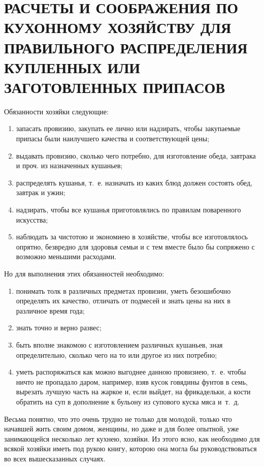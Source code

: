 \section{РАСЧЕТЫ И СООБРАЖЕНИЯ ПО КУХОННОМУ ХОЗЯЙСТВУ ДЛЯ ПРАВИЛЬНОГО РАСПРЕДЕЛЕНИЯ КУПЛЕННЫХ ИЛИ ЗАГОТОВЛЕННЫХ ПРИПАСОВ}%

Обязанности хозяйки следующие: 
\begin{enumerate}
	\item запасать провизию, закупать ее лично или надзирать, чтобы закупаемые припасы были наилучшего качества и соответствующей цены;
	\item выдавать провизию, сколько чего потребно, для изготовление обеда, завтрака и проч. из назначенных кушаньев;
	\item распределять кушанья, т.~е. назначать из каких блюд должен состоять обед, завтрак и ужин;
	\item надзирать, чтобы все кушанья приготовлялись по правилам поваренного искусства;
	\item наблюдать за чистотою и экономиею в хозяйстве, чтобы все изготовлялось опрятно, безвредно для здоровья семьи и с тем вместе было бы сопряжено с возможно меньшими расходами.
\end{enumerate}

Но для выполнения этих обязанностей необходимо: 
\begin{enumerate}
	\item понимать толк в различных предметах провизии, уметь безошибочно определять их качество, отличать от подмесей и знать цены на них в различное время года; 
	\item знать точно и верно развес; 
	\item быть вполне знакомою с изготовлением различных кушаньев, зная определительно, сколько чего на то или другое из них потребно;
	\item уметь распоряжаться как можно выгоднее данною провизиею, т.~е. чтобы ничто не пропадало даром, например, взяв кусок говядины фунтов в семь, вырезать лучшую часть на жаркое и, если выйдет, на фрикадельки, а кости обратить на суп в дополнение к бульону из супового куска мяса и~т.~д.
\end{enumerate}

Весьма понятно, что это очень трудно не только для молодой, только что начавшей жить своим домом, женщины, но даже и для более опытной, уже занимающейся несколько лет кухнею, хозяйки. Из этого ясно, как необходимо для всякой хозяйки иметь под рукою книгу, которою она могла бы руководствоваться во всех вышесказанных случаях.

